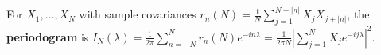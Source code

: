 For $X_1, \ldots, X_N$ with sample covariances $r_n(N) = \frac{1}{N} \sum_{j=1}^{N-|n|} X_j X_{j+|n|}$, the \textbf{periodogram} is $I_N(\lambda) = \frac{1}{2\pi} \sum_{n=-N}^N r_n(N) e^{-in\lambda} = \frac{1}{2\pi N} |\sum_{j=1}^N X_j e^{-ij\lambda}|^2$.
